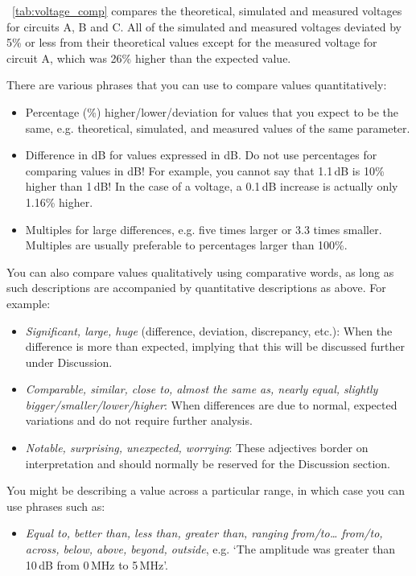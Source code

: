 \documentclass[a4paper, onecolumn, 12pt]{IEEEtran}
\begin{document}
\tablename~\ref{tab:voltage_comp} compares the theoretical, simulated and measured voltages for circuits A, B and C. All of the simulated and measured voltages deviated by 5\% or less from their theoretical values except for the measured voltage for circuit A, which was 26\% higher than the expected value.

There are various phrases that you can use to compare values quantitatively:
\begin{itemize}
    \item Percentage (\%) higher/lower/deviation for values that you expect to be the same, e.g. theoretical, simulated, and measured values of the same parameter.
    \item Difference in dB for values expressed in dB. Do not use percentages for comparing values in dB! For example, you cannot say that 1.1\,dB is 10\% higher than 1\,dB! In the case of a voltage, a 0.1\,dB increase is actually only 1.16\% higher.
    \item Multiples for large differences, e.g. five times larger or 3.3 times smaller. Multiples are usually preferable to percentages larger than 100\%.
\end{itemize}

You can also compare values qualitatively using comparative words, as long as such descriptions are accompanied by quantitative descriptions as above. For example:

\begin{itemize}
    \item \textit{Significant, large, huge} (difference, deviation, discrepancy, etc.): When the difference is more than expected, implying that this will be discussed further under Discussion.
    \item \textit{Comparable, similar, close to, almost the same as, nearly equal, slightly bigger/smaller/lower/higher}: When differences are due to normal, expected variations and do not require further analysis.
    \item\textit{ Notable, surprising, unexpected, worrying}: These adjectives border on interpretation and should normally be reserved for the Discussion section.
\end{itemize}

You might be describing a value across a particular range, in which case you can use phrases such as:

\begin{itemize}
    \item \textit{Equal to, better than, less than, greater than, ranging from/to… from/to, across, below, above, beyond, outside}, e.g. `The amplitude was greater than 10\,dB from 0\,MHz to 5\,MHz'.
\end{itemize}
\end{document}
